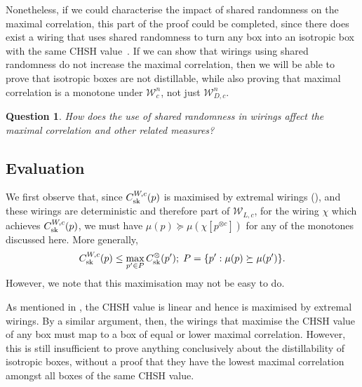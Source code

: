 \documentclass[10pt, a4paper]{article}
\numberwithin{equation}{section} %
\theoremstyle{definition}
\theoremstyle{plain}
\newtheorem{question}{Question}
\newcommand{\st}{\mathrel{:}} %
\newcommand{\?}{\mathrel{?}} %
\newcommand{\sW}{\mathcal{W}}
\newcommand{\sk}{\rm sk}
\begin{document}
                  Nonetheless, if we could characterise the impact of shared randomness on the maximal correlation, this part of the proof could be completed, since there does exist a wiring that uses shared randomness to turn any box into an isotropic box with the same CHSH value~\cite{NSTheories}. If we can show that wirings using shared randomness do not increase the maximal correlation, then we will be able to prove that isotropic boxes are not distillable, while also proving that maximal correlation is a monotone under \(\sW_c^n\), not just \(\sW_{D,c}^n\).
                  \begin{question}
                    How does the use of shared randomness in wirings affect the maximal correlation and other related measures?
                  \end{question}

                  \subsection{Evaluation}

                  We first observe that, since \(C^{W,c}_{\sk}(p)\) is maximised by extremal wirings (), and these wirings are deterministic and therefore part of \(\sW_{L,c}\), for the wiring \(\chi\) which achieves \(C^{W,c}_{\sk}(p)\), we must have \(\mu(p) \succeq \mu(\chi[p^{\otimes c}])\) for any of the monotones discussed here. More generally,
                  \begin{equation}
                    C^{W,c}_{\sk}(p) \leq \max_{p' \in P} C^{\otimes}_{\sk}(p');\; P = \{ p' \st \mu(p) \succeq \mu(p') \}.
                  \end{equation}
                  However, we note that this maximisation may not be easy to do.


                  As mentioned in , the CHSH value is linear and hence is maximised by extremal wirings. By a similar argument, then, the wirings that maximise the CHSH value of any box must map to a box of equal or lower maximal correlation. However, this is still insufficient to prove anything conclusively about the distillability of isotropic boxes, without a proof that they have the lowest maximal correlation amongst all boxes of the same CHSH value.
\end{document}

